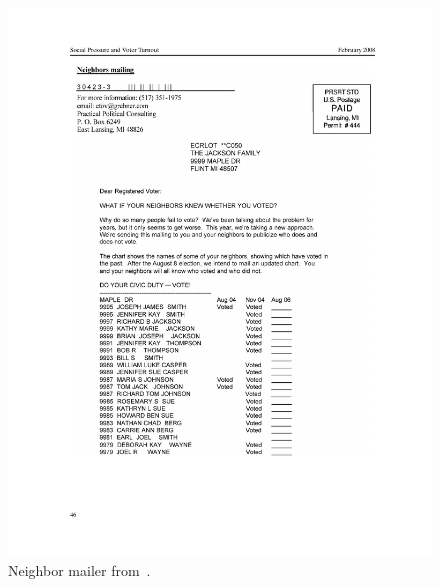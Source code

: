 \documentclass{article}
\begin{document}
\begin{figure}
\centering
\includegraphics[width=\textwidth]{figures/gerber_social_2008_neighbors}
\caption{Neighbor mailer from~\citet{gerber_social_2008}.}
\label{fig:gerber_social_2008_neighbors}
\end{figure}
\end{document}

